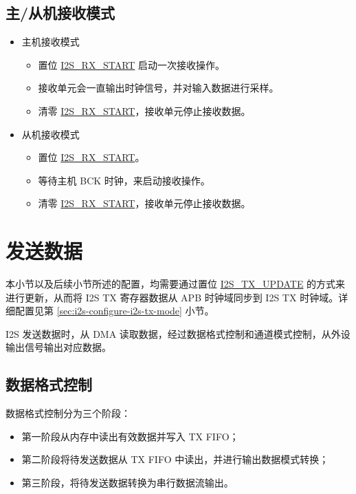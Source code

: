 \documentclass[main\_\_CN.tex]{subfiles}
\begin{document}
\subsection{主/从机接收模式}
\begin{itemize}
    \item 主机接收模式
    \begin{itemize}
        \item 置位 \hyperref[fielddesc:I2SRXSTART]{I2S\_RX\_START} 启动一次接收操作。
        \item 接收单元会一直输出时钟信号，并对输入数据进行采样。
        \item 清零 \hyperref[fielddesc:I2SRXSTART]{I2S\_RX\_START}，接收单元停止接收数据。
    \end{itemize}
    \item 从机接收模式
     \begin{itemize}
        \item 置位 \hyperref[fielddesc:I2SRXSTART]{I2S\_RX\_START}。
        \item 等待主机 BCK 时钟，来启动接收操作。
        \item 清零 \hyperref[fielddesc:I2SRXSTART]{I2S\_RX\_START}，接收单元停止接收数据。
    \end{itemize}
\end{itemize}

\section{发送数据}\label{sec:i2s-tx-data}

\begin{tiplisting}
本小节以及后续小节所述的配置，均需要通过置位 \hyperref[fielddesc:I2STXUPDATE]{I2S\_TX\_UPDATE} 的方式来进行更新，从而将 I2S TX 寄存器数据从 APB 时钟域同步到 I2S TX 时钟域。详细配置见第 \ref{sec:i2s-configure-i2s-tx-mode} 小节。
\end{tiplisting}
\vspace{-2em}
\chipname{} I2S 发送数据时，从 DMA 读取数据，经过数据格式控制和通道模式控制，从外设输出信号输出对应数据。
\subsection{数据格式控制}
数据格式控制分为三个阶段：
\begin{itemize}
    \item 第一阶段从内存中读出有效数据并写入 TX FIFO；
    \item 第二阶段将待发送数据从 TX FIFO 中读出，并进行输出数据模式转换；
    \item 第三阶段，将待发送数据转换为串行数据流输出。
\end{itemize}
\end{document}
